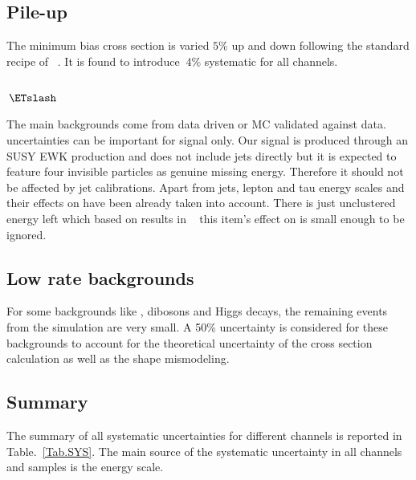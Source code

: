 \subsection{Pile-up}

The minimum bias cross section is varied $5 \%$ up and down following the standard recipe of ~\cite{PU_SYS}. It is found to introduce $~4 \%$ systematic for all channels.    

\subsection{\texorpdfstring{$\met$}{met}}

The main backgrounds come from data driven or MC validated against data. \MET uncertainties can be important for signal only. Our signal is produced through an SUSY EWK production and does not include jets directly but it is expected to feature four invisible particles as genuine missing energy. Therefore it should not be affected by jet calibrations. Apart from jets, lepton and tau energy scales and their effects on \MET have been already taken into account. There is just unclustered energy left which based on results in ~\cite{CMS_AN_2014-099} this item's effect on \MET is small enough to be ignored.

\subsection{Low rate backgrounds} For some backgrounds like \ttbar, dibosons and Higgs decays, the remaining 
events from the simulation are very small. A 50\% uncertainty is considered for these backgrounds to account for the theoretical uncertainty of the
cross section calculation as well as the shape mismodeling.

\subsection{Summary}
The summary of all systematic uncertainties for different channels is reported in Table.~\ref{Tab.SYS}. The main source of the systematic uncertainty in all channels and samples is the \hadtau energy scale.


